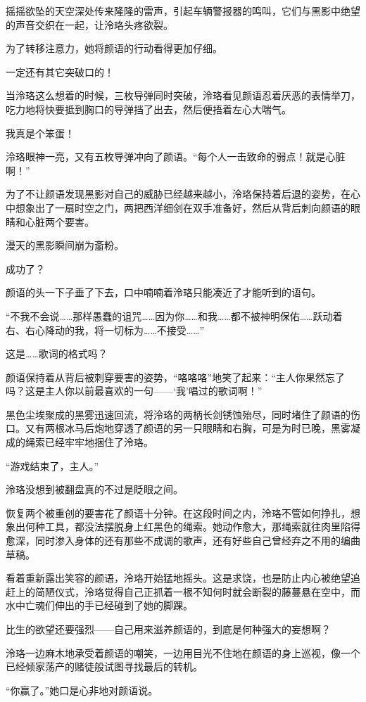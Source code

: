 \documentclass[UTF8, scheme = chinese, openany]{ctexbook}
\begin{document}
摇摇欲坠的天空深处传来隆隆的雷声，引起车辆警报器的鸣叫，它们与黑影中绝望的声音交织在一起，让泠珞头疼欲裂。

为了转移注意力，她将颜语的行动看得更加仔细。

一定还有其它突破口的！

当泠珞这么想着的时候，三枚导弹同时突破，泠珞看见颜语忍着厌恶的表情举刀，吃力地将快要抵到胸口的导弹挡了出去，然后便捂着左心大喘气。

我真是个笨蛋！

泠珞眼神一亮，又有五枚导弹冲向了颜语。“每个人一击致命的弱点！就是心脏啊！”

为了不让颜语发现黑影对自己的威胁已经越来越小，泠珞保持着后退的姿势，在心中想象出了一扇时空之门，两把西洋细剑在双手准备好，然后从背后刺向颜语的眼睛和心脏两个要害。

漫天的黑影瞬间崩为齑粉。

成功了？

颜语的头一下子垂了下去，口中喃喃着泠珞只能凑近了才能听到的语句。

“不我不会说……那样愚蠢的诅咒……因为你……和我……都不被神明保佑……跃动着右、右心降动的我，将一切标为……不接受……”

这是……歌词的格式吗？

颜语保持着从背后被刺穿要害的姿势，“咯咯咯”地笑了起来：“主人你果然忘了吗？这是主人你以前最喜欢的一句——‘我’唱过的歌词啊！”

黑色尘埃聚成的黑雾迅速回流，将泠珞的两柄长剑锈蚀殆尽，同时堵住了颜语的伤口。又有两根冰马后炮地穿透了颜语的另一只眼睛和右胸，可是为时已晚，黑雾凝成的绳索已经牢牢地捆住了泠珞。

“游戏结束了，主人。”

泠珞没想到被翻盘真的不过是眨眼之间。

恢复两个被重创的要害花了颜语十分钟。在这段时间之内，泠珞不管如何挣扎，想象出何种工具，都没法摆脱身上红黑色的绳索。她动作愈大，那绳索就往肉里陷得愈深，同时渗入身体的还有那些不成调的歌声，还有好些自己曾经弃之不用的编曲草稿。

看着重新露出笑容的颜语，泠珞开始猛地摇头。这是求饶，也是防止内心被绝望追赶上的简陋仪式，泠珞觉得自己正抓着一根不知何时就会断裂的藤蔓悬在空中，而水中亡魂们伸出的手已经碰到了她的脚踝。

比生的欲望还要强烈——自己用来滋养颜语的，到底是何种强大的妄想啊？

泠珞一边麻木地承受着颜语的嘲笑，一边用目光不住地在颜语的身上巡视，像一个已经倾家荡产的赌徒般试图寻找最后的转机。

“你赢了。”她口是心非地对颜语说。
\end{document}
